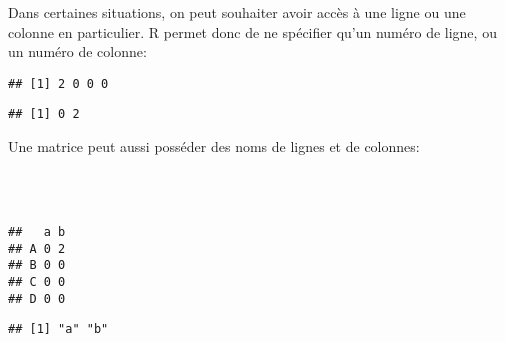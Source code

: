 Dans certaines situations, on peut souhaiter avoir accès à une ligne ou une colonne en particulier.
R permet donc de ne spécifier qu'un numéro de ligne, ou un numéro de colonne:

\begin{knitrout}
\color{fgcolor}\begin{kframe}
\begin{flushleft}
\ttfamily\noindent
{}\hlkeyword{[}\hlkeyword{,}{\ }\hlkeyword{]}\mbox{}
\normalfont
\end{flushleft}
\begin{verbatim}
## [1] 2 0 0 0
\end{verbatim}
\begin{flushleft}
\ttfamily\noindent
{}\hlkeyword{[}\hlkeyword{,}{\ }\hlkeyword{]}\mbox{}
\normalfont
\end{flushleft}
\begin{verbatim}
## [1] 0 2
\end{verbatim}
\end{kframe}
\end{knitrout}


Une matrice peut aussi posséder des noms de lignes et de colonnes:

\begin{knitrout}
\color{fgcolor}\begin{kframe}
\begin{flushleft}
\ttfamily\noindent
{}\hlkeyword{(}\hlkeyword{)}{\ }\hlassignement{\usebox{\hlnormalsizeboxlessthan}-}{\ }\hlkeyword{(}\hlkeyword{,}{\ }\hlkeyword{)}\hspace*{\fill}\\
\hlstd{}\hlkeyword{(}\hlkeyword{)}{\ }\hlassignement{\usebox{\hlnormalsizeboxlessthan}-}{\ }\hlkeyword{(}\hlkeyword{,}{\ }\hlkeyword{,}{\ }\hlkeyword{,}{\ }\hlkeyword{)}\hspace*{\fill}\\
\hlstd{}\mbox{}
\normalfont
\end{flushleft}
\begin{verbatim}
##   a b
## A 0 2
## B 0 0
## C 0 0
## D 0 0
\end{verbatim}
\begin{flushleft}
\ttfamily\noindent
{}\hlkeyword{(}\hlkeyword{)}\mbox{}
\normalfont
\end{flushleft}
\begin{verbatim}
## [1] "a" "b"
\end{verbatim}
\end{kframe}
\end{knitrout}


